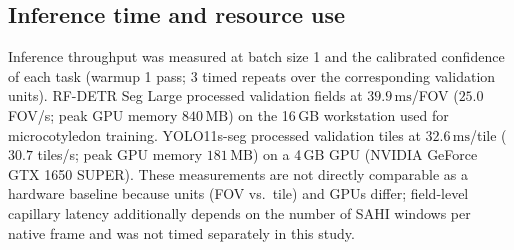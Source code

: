 \subsection{Inference time and resource use}

Inference throughput was measured at batch size 1 and the calibrated confidence of each task (warmup 1 pass; 3 timed repeats over the corresponding validation units). RF-DETR Seg Large processed validation fields at $39.9\,\mathrm{ms}$/FOV ($25.0$ FOV/s; peak GPU memory $840\,\mathrm{MB}$) on the 16\,GB workstation used for microcotyledon training. YOLO11s-seg processed validation tiles at $32.6\,\mathrm{ms}$/tile ($30.7$ tiles/s; peak GPU memory $181\,\mathrm{MB}$) on a 4\,GB GPU (NVIDIA GeForce GTX 1650 SUPER). These measurements are not directly comparable as a hardware baseline because units (FOV vs.\ tile) and GPUs differ; field-level capillary latency additionally depends on the number of SAHI windows per native frame and was not timed separately in this study.


